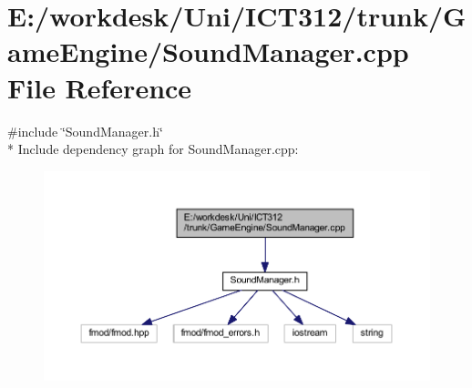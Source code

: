 \section{E\+:/workdesk/\+Uni/\+I\+C\+T312/trunk/\+Game\+Engine/\+Sound\+Manager.cpp File Reference}
\label{_sound_manager_8cpp}
{\ttfamily \#include \char`\"{}Sound\+Manager.\+h\char`\"{}}\\*
Include dependency graph for Sound\+Manager.\+cpp\+:\nopagebreak
\begin{figure}[H]
\begin{center}
\leavevmode
\includegraphics[width=350pt]{de/db0/_sound_manager_8cpp__incl}
\end{center}
\end{figure}
